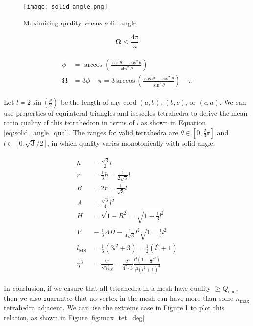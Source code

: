 \begin{figure}
\begin{center}
\texttt{[image: solid\_angle.png]}
\caption{Maximizing quality versus solid angle}
\label{fig:solid_angle}
\end{center}
\end{figure}

\begin{equation} \label{eq:solid_angle_degree}
\mathbf{\Omega} \leq \frac{4\pi}{n}
\end{equation}

\begin{gather} \label{eq:solid2side}
\begin{split}
\phi &= \arccos\left(\frac{\cos\theta - \cos^2\theta}{\sin^2\theta}\right) \\
\mathbf{\Omega} &= 3\phi - \pi = 3\arccos\left(\frac{\cos\theta - \cos^2\theta}{\sin^2\theta}\right) - \pi
\end{split}
\end{gather}

Let $l=2\sin\left(\frac{\theta}{2}\right)$ be the length of any cord $(a,b)$, $(b,c)$, or $(c,a)$.
We can use properties of equilateral triangles and isosceles
tetrahedra to derive the mean ratio quality of this tetrahedron
in terms of $l$ as shown in Equation \ref{eq:solid_angle_qual}.
The ranges for valid tetrahedra are $\theta\in[0,\frac23\pi]$ and $l\in[0,\sqrt{3}/2]$,
in which quality varies monotonically with solid angle.

\begin{gather} \label{eq:solid_angle_qual}
\begin{split}
h &= \tfrac{\sqrt{3}}{2}l \\
r &= \tfrac13 h = \tfrac{1}{2\sqrt{3}}l \\
R &= 2r = \tfrac{1}{\sqrt{3}}l \\
A &= \tfrac{\sqrt{3}}{4}l^2 \\
H &= \sqrt{1-R^2} = \sqrt{1-\tfrac13 l^2} \\
V &= \tfrac13 A H = \tfrac{1}{4\sqrt{3}} l^2\sqrt{1-\tfrac13 l^2} \\
l_{\text{MS}} &= \tfrac16(3l^2 + 3) = \tfrac12(l^2 + 1) \\
\eta^3 &= \frac{V^2}{\gamma^2 l_{\text{MS}}^3} =
\frac{2^3}{4^2\cdot 3}\frac{l^4(1-\tfrac13 l^2)}{\gamma^2 (l^2 + 1)^3}
\end{split}
\end{gather}

In conclusion, if we ensure that all tetrahedra in a mesh have
quality $\geq Q_{\text{min}}$, then we also guarantee that no
vertex in the mesh can have more than some $n_{\text{max}}$
tetrahedra adjacent.
We can use the extreme case in Figure \ref{fig:solid_angle}
to plot this relation, as shown in Figure \ref{fig:max_tet_deg}

